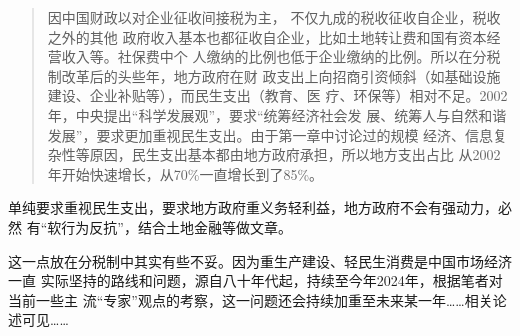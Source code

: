 \begin{quotation}
  因中国财政以对企业征收间接税为主， 不仅九成的税收征收自企业，税收之外的其他
  政府收入基本也都征收自企业，比如土地转让费和国有资本经营收入等。社保费中个
  人缴纳的比例也低于企业缴纳的比例。所以在分税制改革后的头些年，地方政府在财
  政支出上向招商引资倾斜（如基础设施建设、企业补贴等），而民生支出（教育、医
  疗、环保等）相对不足。2002年，中央提出“科学发展观”，要求“统筹经济社会发
  展、统筹人与自然和谐发展”，要求更加重视民生支出。由于第一章中讨论过的规模
  经济、信息复杂性等原因，民生支出基本都由地方政府承担，所以地方支出占比
  从2002年开始快速增长，从70\%一直增长到了85\%。\cite{zhishenshinei}
\end{quotation}
单纯要求重视民生支出，要求地方政府重义务轻利益，地方政府不会有强动力，必然
有“软行为反抗”，结合土地金融等做文章。

这一点放在分税制中其实有些不妥。因为重生产建设、轻民生消费是中国市场经济一直
实际坚持的路线和问题，源自八十年代起，持续至今年2024年，根据笔者对当前一些主
流“专家”观点的考察，这一问题还会持续加重至未来某一年……相关论述可见……











